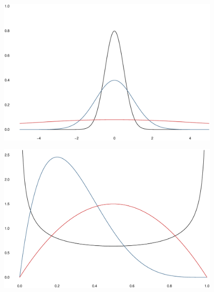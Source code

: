 \documentclass{beamer}
\begin{document}
\begin{frame}
  \begin{figure}
    \includegraphics[scale=.3]{prior_normal.eps}
  \end{figure}
\end{frame}

\begin{frame}
\begin{figure}
    \includegraphics[scale=.3]{prior_beta.eps}
  \end{figure}
\end{frame}
\end{document}
